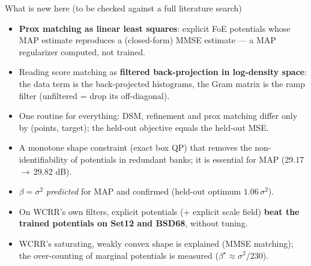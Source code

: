 \documentclass[10pt,aspectratio=169]{beamer}
\begin{document}
\begin{frame}{What is new here (to be checked against a full literature search)}
\begin{novbox}[title={Methodology}]
\small
\begin{itemize}
\item \textbf{Prox matching as linear least squares}: explicit FoE potentials whose MAP estimate
      reproduces a (closed-form) MMSE estimate --- a MAP regularizer computed, not trained.
\item Reading score matching as \textbf{filtered back-projection in log-density space}: the data term
      is the back-projected histograms, the Gram matrix is the ramp filter (unfiltered = drop its off-diagonal).
\item One routine for everything: DSM, refinement and prox matching differ only by (points, target);
      the held-out objective equals the held-out MSE.
\item A monotone shape constraint (exact box QP) that removes the non-identifiability of potentials in
      redundant banks; it is essential for MAP (29.17\,$\to$\,29.82 dB).
\end{itemize}
\end{novbox}
\begin{novbox}[title={Results and interpretation}]
\small
\begin{itemize}
\item $\beta=\sigma^2$ \emph{predicted} for MAP and confirmed (held-out optimum $1.06\,\sigma^2$).
\item On WCRR's own filters, explicit potentials (+ explicit scale field) \textbf{beat the trained
      potentials on Set12 and BSD68}, without tuning.
\item WCRR's saturating, weakly convex shape is explained (MMSE matching); the over-counting of
      marginal potentials is measured ($\beta^\star\approx\sigma^2/230$).
\end{itemize}
\end{novbox}
\end{frame}
\end{document}
